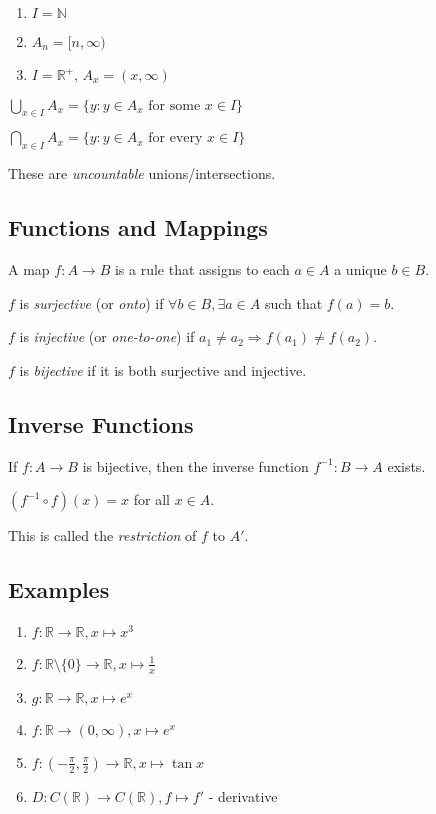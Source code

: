 \documentclass[12pt,a4paper]{article}
\begin{document}
\begin{enumerate}
\item $I = \mathbb{N}$
\item $A_n = [n, \infty)$
\item $I = \mathbb{R}^+$, $A_x = (x, \infty)$
\end{enumerate}

\begin{center}
$\bigcup_{x \in I} A_x = \{y : y \in A_x \text{ for some } x \in I\}$

$\bigcap_{x \in I} A_x = \{y : y \in A_x \text{ for every } x \in I\}$
\end{center}

These are \textit{uncountable} unions/intersections.

\subsection{Functions and Mappings}
A map $f: A \to B$ is a rule that assigns to each $a \in A$ a unique $b \in B$.

$f$ is \textit{surjective} (or \textit{onto}) if $\forall b \in B, \exists a \in A$ such that $f(a) = b$.

$f$ is \textit{injective} (or \textit{one-to-one}) if $a_1 \neq a_2 \Rightarrow f(a_1) \neq f(a_2)$.

$f$ is \textit{bijective} if it is both surjective and injective.

\subsection{Inverse Functions}
If $f: A \to B$ is bijective, then the inverse function $f^{-1}: B \to A$ exists.

$(f^{-1} \circ f)(x) = x$ for all $x \in A$.

This is called the \textit{restriction} of $f$ to $A'$.

\subsection{Examples}
\begin{enumerate}
\item $f: \mathbb{R} \to \mathbb{R}, x \mapsto x^3$
\item $f: \mathbb{R} \setminus \{0\} \to \mathbb{R}, x \mapsto \frac{1}{x}$
\item $g: \mathbb{R} \to \mathbb{R}, x \mapsto e^x$
\item $f: \mathbb{R} \to (0, \infty), x \mapsto e^x$
\item $f: (-\frac{\pi}{2}, \frac{\pi}{2}) \to \mathbb{R}, x \mapsto \tan x$
\item $D: C(\mathbb{R}) \to C(\mathbb{R}), f \mapsto f'$ - derivative
\end{enumerate}
\end{document}
